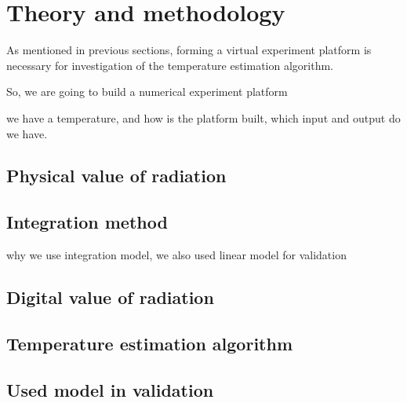 \chapter{Theory and methodology}%
As mentioned in previous sections, forming a virtual experiment platform 
is necessary for investigation of the temperature estimation algorithm. 


So, we are going to build a numerical experiment platform

we have a temperature, and how is the platform built, which input and 
output do we have.
%
%

%
%
\section{Physical value of radiation}%

%
%
\section{Integration method}%
why we use integration model, we also used linear model for validation
%
%
\section{Digital value of radiation}%

%
%

\section{Temperature estimation algorithm}


\section{Used model in validation}%

%
%
